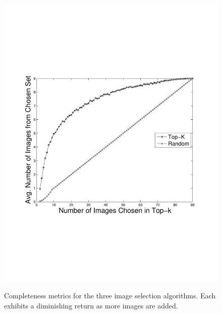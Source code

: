 \begin{figure}
{        \includegraphics[clip=true, trim = 17mm 65mm 25mm 70mm, scale=0.23]{figures/topk/avg_num_matching.pdf}
        \label{fig:topkAvgNumSameSet}
        }
        \vspace{-1mm}
   \caption{Completeness metrics for the three image selection algorithms. Each exhibits a diminishing return as more images are added.}
   \label{fig:completeness_exp_results}
   \vspace{-6mm}
\end{figure}

%        

